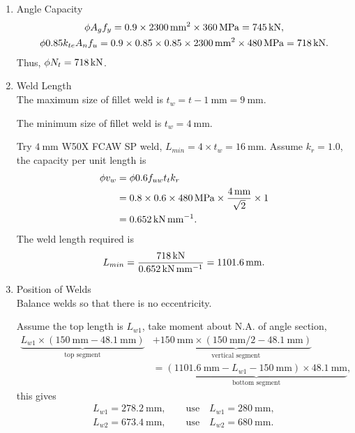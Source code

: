 \begin{solution}
\begin{enumerate}
\item Angle Capacity
\begin{gather*}
\phi{}A_gf_y=0.9\times\SI{2300}{\milli\meter^2}\times\SI{360}{\mega\pascal}=\SI{745}{\kilo\newton},\\
\phi0.85k_{te}A_nf_u=0.9\times0.85\times0.85\times\SI{2300}{\milli\meter^2}\times\SI{480}{\mega\pascal}=\SI{718}{\kilo\newton}.
\end{gather*}
Thus, $\phi{}N_t=\SI{718}{\kilo\newton}$.
\item Weld Length\\
The maximum size of fillet weld is $t_w=t-\SI{1}{\mm}=\SI{9}{\mm}$.

The minimum size of fillet weld is $t_w=\SI{4}{\mm}$.

Try $\SI{4}{\mm}$ W50X FCAW SP weld, $L_{min}=4\times{}t_w=\SI{16}{\mm}$.
Assume $k_r=1.0$, the capacity per unit length is
\begin{align*}
\phi{}v_w&=\phi{}0.6f_{uw}t_tk_r\\
&=0.8\times0.6\times\SI{480}{\mega\pascal}\times\dfrac{\SI{4}{\milli\meter}}{\sqrt{2}}\times1\\
&=\SI{0.652}{\kilo\newton\per\milli\meter}.
\end{align*}
The weld length required is
\begin{gather*}
L_{min}=\dfrac{\SI{718}{\kilo\newton}}{\SI{0.652}{\kilo\newton\per\milli\meter}}=\SI{1101.6}{\milli\meter}.
\end{gather*}
\item Position of Welds\\
Balance welds so that there is no eccentricity.
\begin{figure}[H]
\centering

\end{figure}
Assume the top length is $L_{w1}$, take moment about N.A. of angle section,
\begin{align*}
\underbrace{L_{w1}\times\left(\SI{150}{\mm}-\SI{48.1}{\mm}\right)}_\text{top segment}&+\underbrace{\SI{150}{\mm}\times\left(\SI{150}{\mm}/2-\SI{48.1}{\mm}\right)}_\text{vertical segment}\\&=\underbrace{\left(\SI{1101.6}{\mm}-L_{w1}-\SI{150}{\mm}\right)\times\SI{48.1}{\mm}}_\text{bottom segment},
\end{align*}
this gives
\begin{gather*}
L_{w1}=\SI{278.2}{\mm},\qquad\text{use}\quad{}L_{w1}=\SI{280}{\mm},\\
L_{w2}=\SI{673.4}{\mm},\qquad\text{use}\quad{}L_{w2}=\SI{680}{\mm}.
\end{gather*}


\end{enumerate}
\end{solution}
